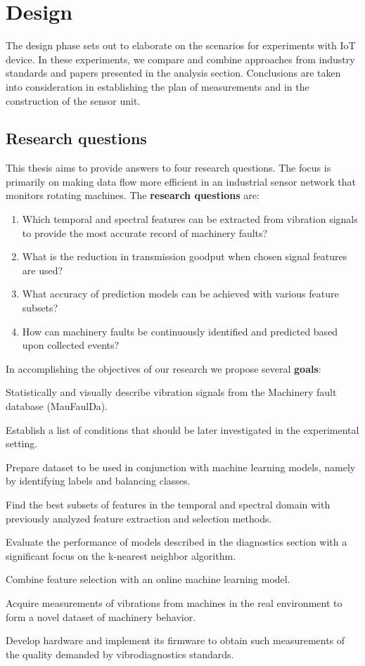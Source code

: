 \chapter{Design} \label{chapter:design}
The design phase sets out to elaborate on the scenarios for experiments with IoT device. In these experiments, we compare and combine approaches from industry standards and papers presented in the analysis section. Conclusions are taken into consideration in establishing the plan of measurements and in the construction of the sensor unit.

\section{Research questions}
This thesis aims to provide answers to four research questions. The focus is primarily on making data flow more efficient in an industrial sensor network that monitors rotating machines. The \textbf{research questions} are:
\begin{enumerate}[label=RQ\arabic*., font=\bfseries]
    \itemsep0pt
	\item Which temporal and spectral features can be extracted from vibration signals to provide the most accurate record of machinery faults?
	\item What is the reduction in transmission goodput when chosen signal features are used?
	\item What accuracy of prediction models can be achieved with various feature subsets?
	\item How can machinery faults be continuously identified and predicted based upon collected events?
\end{enumerate}

\noindent In accomplishing the objectives of our research we propose several \textbf{goals}:
\begin{todolist}
    \itemsep0pt
    \item Statistically and visually describe vibration signals from the Machinery fault database (MauFaulDa).
    \item Establish a list of conditions that should be later investigated in the experimental setting.
    \item Prepare dataset to be used in conjunction with machine learning models, namely by identifying labels and balancing classes.
    \item Find the best subsets of features in the temporal and spectral domain with previously analyzed feature extraction and selection methods.
    \item Evaluate the performance of models described in the diagnostics section with a significant focus on the k-nearest neighbor algorithm.
    \item Combine feature selection with an online machine learning model.
    \item Acquire measurements of vibrations from machines in the real environment to form a novel dataset of machinery behavior.
    \item Develop hardware and implement its firmware to obtain such measurements of the quality demanded by vibrodiagnostics standards.
\end{todolist}

